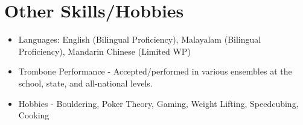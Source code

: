 \documentclass[letterpaper,11pt]{article}
\begin{document}
 

\section{Other Skills/Hobbies}

    \begin{itemize}
      
      \setlength\itemsep{-1pt}
      \item\small{Languages: English (Bilingual Proficiency), Malayalam (Bilingual Proficiency), Mandarin Chinese (Limited WP)}
      \item{Trombone Performance - Accepted/performed in various ensembles at the school, state, and all-national levels.}
      \item{Hobbies - Bouldering, Poker Theory, Gaming, Weight Lifting, Speedcubing, Cooking }
    \end{itemize}
                
\end{document}

